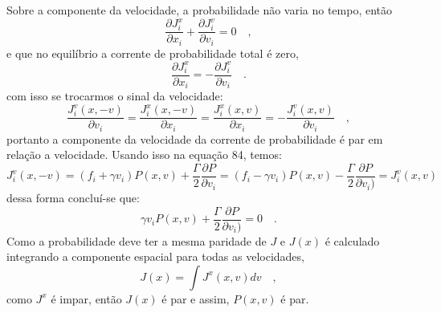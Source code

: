 \documentclass[12pt]{article}
\begin{document}
Sobre a componente da velocidade, a probabilidade não varia no tempo, então
\begin{equation}
\frac{\partial J_i^x}{\partial x_i} + \frac{\partial J_i^v}{\partial v_i} = 0\quad,
\end{equation} 
e que no equilíbrio a corrente de probabilidade total é zero, 
\begin{equation}
\frac{\partial J_i^x}{\partial x_i} = -\frac{ \partial J_i^v}{\partial v_i} \quad.
\end{equation}
com isso se trocarmos o sinal da velocidade:
\begin{equation}
\frac{J_i^v(x, -v)}{\partial v_i} = \frac{J_i^x(x, -v)}{\partial x_i}  = \frac{J_i^x(x, v)}{\partial x_i}  = -\frac{J_i^v(x, v)}{\partial v_i}  \quad,
\end{equation}
portanto a componente da velocidade da corrente de probabilidade é par em relação a velocidade. Usando isso na equação 84, temos:
\begin{equation}
J_i^v(x, -v) = (f_i + \gamma v_i)P(x,v) + \frac{\Gamma}{2} \frac{\partial P}{\partial v_i} =  (f_i - \gamma v_i)P(x,v) - \frac{\Gamma}{2} \frac{\partial P}{\partial v_i)} = J_i^v(x, v)
\end{equation}
dessa forma concluí-se que:
\begin{equation}
\gamma v_iP(x,v) + \frac{\Gamma}{2} \frac{\partial P}{\partial v_i)} = 0 \quad .
\end{equation}
Como a probabilidade deve ter a mesma paridade de $J$ e $J(x)$ é calculado integrando a componente espacial para todas as velocidades,
\begin{equation}
J(x) = \int J^x(x, v) dv \quad, 
\end{equation}
como $J^x$ é impar, então $J(x)$ é par e assim, $P(x, v)$ é par.
\end{document}

